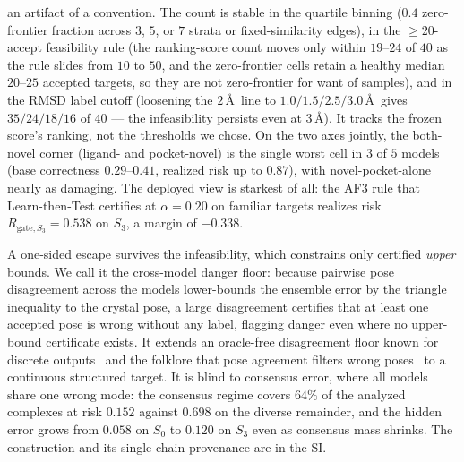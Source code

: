 \documentclass[10pt]{article}
\begin{document}
an artifact of a convention. The count is stable in the quartile binning ($0.4$ zero-frontier fraction
across $3$, $5$, or $7$ strata or fixed-similarity edges), in the $\ge\!20$-accept feasibility rule (the
ranking-score count moves only within $19$--$24$ of $40$ as the rule slides from $10$ to $50$, and the
zero-frontier cells retain a healthy median $20$--$25$ accepted targets, so they are not zero-frontier for
want of samples), and in the RMSD label cutoff (loosening the $2$\,\AA\ line to $1.0/1.5/2.5/3.0$\,\AA\ gives
$35/24/18/16$ of $40$ --- the infeasibility persists even at $3$\,\AA). It tracks the frozen score's ranking,
not the thresholds we chose. On the two axes jointly, the both-novel corner (ligand- and pocket-novel) is
the single worst cell in $3$ of $5$ models (base correctness $0.29$--$0.41$, realized risk up to $0.87$),
with novel-pocket-alone nearly as damaging. The deployed view is starkest of all: the AF3 rule that Learn-then-Test certifies at $\alpha=0.20$
on familiar targets realizes risk $R_{\mathrm{gate},S_3}=0.538$ on $S_3$, a margin of $-0.338$.

A one-sided escape survives the infeasibility, which constrains only certified \emph{upper} bounds. We call
it the cross-model danger floor: because pairwise pose disagreement across the models lower-bounds the
ensemble error by the triangle inequality to the crystal pose, a large disagreement certifies that at least
one accepted pose is wrong without any label, flagging danger even where no upper-bound certificate exists.
It extends an oracle-free disagreement floor known for discrete outputs~\citep{incoherence,credal} and the
folklore that pose agreement filters wrong poses~\citep{consensusdocking} to a continuous structured
target. It is blind to consensus error, where all
models share one wrong mode: the consensus regime covers $64\%$ of the analyzed complexes at risk $0.152$
against $0.698$ on the diverse remainder, and the hidden error grows from $0.058$ on $S_0$ to $0.120$ on
$S_3$ even as consensus mass shrinks. The construction and its single-chain provenance are in the SI.
\end{document}
